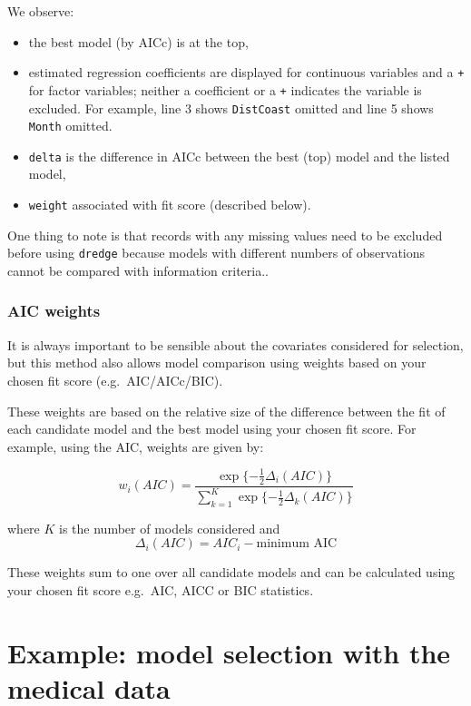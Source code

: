 \documentclass[
  oneside]{krantz}
\providecommand{\tightlist}{%
  \setlength{\itemsep}{0pt}\setlength{\parskip}{0pt}}
\begin{document}
\normalsize

We observe:

\begin{itemize}
\tightlist
\item
  the best model (by AICc) is at the top,
\item
  estimated regression coefficients are displayed for continuous variables and a \texttt{+} for factor variables; neither a coefficient or a \texttt{+} indicates the variable is excluded. For example, line 3 shows \texttt{DistCoast} omitted and line 5 shows \texttt{Month} omitted.
\item
  \texttt{delta} is the difference in AICc between the best (top) model and the listed model,
\item
  \texttt{weight} associated with fit score (described below).
\end{itemize}

One thing to note is that records with any missing values need to be excluded before using \texttt{dredge} because models with different numbers of observations cannot be compared with information criteria..

\hypertarget{aic-weights}{%
\subsubsection{AIC weights}\label{aic-weights}}

It is always important to be sensible about the covariates considered for selection, but this method also allows model comparison using weights based on your chosen fit score (e.g.~AIC/AICc/BIC).

These weights are based on the relative size of the difference between the fit of each candidate model and the best model using your chosen fit score. For example, using the AIC, weights are given by:

\begin{equation}\label{AICWeights}
w_i(AIC)=\frac{\exp\{-\frac{1}{2}\Delta_i(AIC)\}}{\sum_{k=1}^K\exp\{-\frac{1}{2}\Delta_k(AIC)\}}
\end{equation}

where \(K\) is the number of models considered and
\[ \Delta_i(AIC)=AIC_{i}- \textrm{minimum AIC} \]

These weights sum to one over all candidate models and can be calculated using your chosen fit score e.g.~AIC, AICC or BIC statistics.

\hypertarget{example-model-selection-with-the-medical-data}{%
\section{Example: model selection with the medical data}\label{example-model-selection-with-the-medical-data}}
\end{document}
